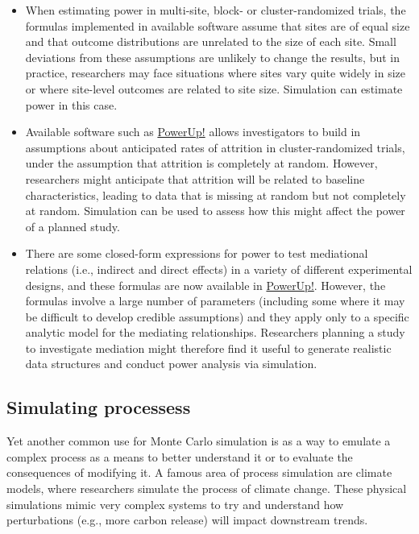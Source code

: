 \documentclass[
]{book}
\begin{document}
\begin{itemize}
\item
  When estimating power in multi-site, block- or cluster-randomized trials, the formulas implemented in available software assume that sites are of equal size and that outcome distributions are unrelated to the size of each site.
  Small deviations from these assumptions are unlikely to change the results, but in practice, researchers may face situations where sites vary quite widely in size or where site-level outcomes are related to site size.
  Simulation can estimate power in this case.
\item
  Available software such as \href{https://www.causalevaluation.org/power-analysis.html}{PowerUp!} allows investigators to build in assumptions about anticipated rates of attrition in cluster-randomized trials, under the assumption that attrition is completely at random.
  However, researchers might anticipate that attrition will be related to baseline characteristics, leading to data that is missing at random but not completely at random.
  Simulation can be used to assess how this might affect the power of a planned study.
\item
  There are some closed-form expressions for power to test mediational relations (i.e., indirect and direct effects) in a variety of different experimental designs, and these formulas are now available in \href{https://www.causalevaluation.org/power-analysis.html}{PowerUp!}.
  However, the formulas involve a large number of parameters (including some where it may be difficult to develop credible assumptions) and they apply only to a specific analytic model for the mediating relationships.
  Researchers planning a study to investigate mediation might therefore find it useful to generate realistic data structures and conduct power analysis via simulation.
\end{itemize}

\subsection{Simulating processess}\label{simulating-processess}

Yet another common use for Monte Carlo simulation is as a way to emulate a complex process as a means to better understand it or to evaluate the consequences of modifying it.
A famous area of process simulation are climate models, where researchers simulate the process of climate change.
These physical simulations mimic very complex systems to try and understand how perturbations (e.g., more carbon release) will impact downstream trends.
\end{document}
